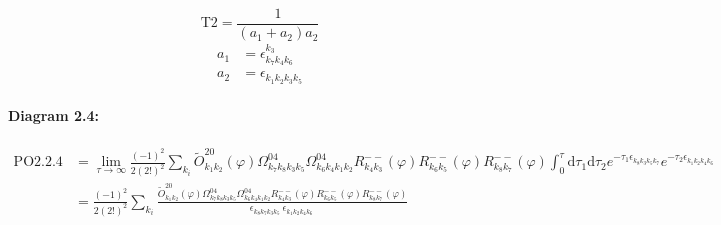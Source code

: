 \documentclass[10pt,a4paper]{article}
\begin{document}
\begin{equation}
\text{T}2 = \frac{1}{(a_1+ a_2)a_2}\end{equation}
\begin{align*}
a_1 &= \epsilon^{k_{3}}_{k_{7}k_{4}k_{6}}\\
a_2 &= \epsilon^{}_{k_{1}k_{2}k_{3}k_{5}}
\end{align*}
\paragraph{Diagram 2.4:}
\begin{align}
\text{PO}2.2.4
&= \lim\limits_{\tau \to \infty}\frac{(-1)^2 }{2(2!)^2}\sum_{k_i}\tilde{O}^{20}_{k_{1}k_{2}} (\varphi) \Omega^{04}_{k_{7}k_{8}k_{3}k_{5}} \Omega^{04}_{k_{6}k_{4}k_{1}k_{2}} R^{--}_{k_{4}k_{3}}(\varphi) R^{--}_{k_{6}k_{5}}(\varphi) R^{--}_{k_{8}k_{7}}(\varphi)\int_{0}^{\tau}\mathrm{d}\tau_1\mathrm{d}\tau_2e^{-\tau_1 \epsilon^{}_{k_{8}k_{3}k_{5}k_{7}}}e^{-\tau_2 \epsilon^{}_{k_{1}k_{2}k_{4}k_{6}}}
 \nonumber \\
&= \frac{(-1)^2 }{2(2!)^2}\sum_{k_i}\frac{\tilde{O}^{20}_{k_{1}k_{2}} (\varphi) \Omega^{04}_{k_{7}k_{8}k_{3}k_{5}} \Omega^{04}_{k_{6}k_{4}k_{1}k_{2}} R^{--}_{k_{4}k_{3}}(\varphi) R^{--}_{k_{6}k_{5}}(\varphi) R^{--}_{k_{8}k_{7}}(\varphi)}{\epsilon^{}_{k_{8}k_{7}k_{3}k_{5}}\ \epsilon^{}_{k_{1}k_{2}k_{4}k_{6}}\ } 
\end{align}
\end{document}
